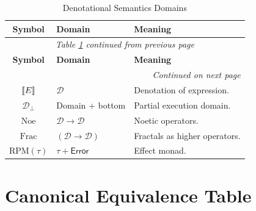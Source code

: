 \renewcommand{\arraystretch}{1.25}
\small
\begin{longtable}{c|p{2.5cm}|p{7cm}}
\caption{Denotational Semantics Domains}
\label{tab:denotational-domains} \\
\toprule
\textbf{Symbol}
& \textbf{Domain}
& \textbf{Meaning}
\\
\midrule
\endfirsthead
\multicolumn{3}{c}{\textit{Table \ref{tab:denotational-domains} continued from previous page}} \\
\toprule
\textbf{Symbol}
& \textbf{Domain}
& \textbf{Meaning}
\\
\midrule
\endhead
\midrule
\multicolumn{3}{r}{\textit{Continued on next page}} \\
\endfoot
\bottomrule
\endlastfoot

$\llbracket E \rrbracket$ & $\mathcal{D}$ & Denotation of expression. \\

$\mathcal{D}_\bot$ & Domain + bottom & Partial execution domain. \\

$\text{Noe}$ & $\mathcal{D}\to\mathcal{D}$ & Noetic operators. \\

$\text{Frac}$ & $(\mathcal{D}\to\mathcal{D})$ & Fractals as higher operators. \\

$\text{RPM}(\tau)$ & $\tau + \mathsf{Error}$ & Effect monad. \\

\end{longtable}
\normalsize

\section{Canonical Equivalence Table}

